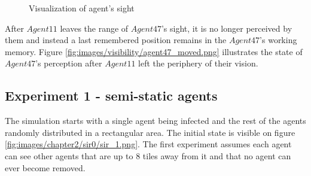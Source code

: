 \begin{figure}[H]
    \centering
    \hspace*{\fill}

    \caption{Visualization of agent's sight}
\end{figure}

After $Agent11$ leaves the range of $Agent47$'s sight, it is no longer perceived by them and instead a last remembered position remains in the $Agent47$'s working memory.
Figure \ref{fig:images/visibility/agent47_moved.png} illustrates the state of $Agent47$'s perception after $Agent11$ left the periphery of their vision.

\subsection{Experiment 1 - semi-static agents}

The simulation starts with a single agent being infected and the rest of the agents randomly distributed in a rectangular area.
The initial state is visible on figure \ref{fig:images/chapter2/sir0/sir_1.png}.
The first experiment assumes each agent can see other agents that are up to 8 tiles away from it and that no agent can ever become removed.

